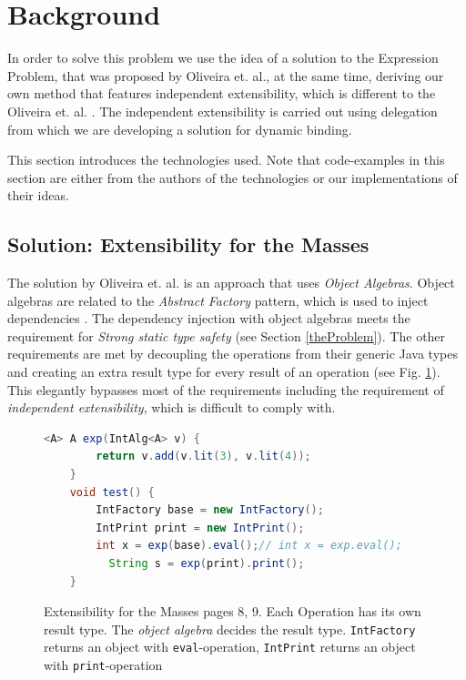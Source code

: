 \documentclass{report}
\begin{document}
\section{Background}

In order to solve this problem we use the idea of a solution to the Expression Problem, that was proposed by Oliveira et. al., at the same time, deriving our own method that features independent extensibility, which is different to the Oliveira et. al. \cite{Oliv-Extensibility-2012}. The independent extensibility is carried out using delegation from which we are developing a solution for dynamic binding.

This section introduces the technologies used. Note that code-examples in this section are either from the authors of the technologies or our implementations of their ideas.


\subsection{Solution: Extensibility for the Masses}

The solution by Oliveira et. al. \cite{Oliv-Extensibility-2012} is an approach that uses \emph{Object Algebras}. Object algebras are related to the \emph{Abstract Factory} pattern, which is used to inject dependencies \cite{Gof-Design-1993}. The dependency injection with object algebras meets the requirement for \emph{Strong static type safety} (see Section \ref{theProblem}). The other requirements are met by decoupling the operations from their generic Java types and creating an extra result type for every result of an operation (see Fig. \ref{differentAlgebras}). This elegantly bypasses most of the requirements including the requirement of \emph{independent extensibility}, which is difficult to comply with.

\begin{figure}[h]
\begin{lstlisting}[language=java]
    <A> A exp(IntAlg<A> v) {
        return v.add(v.lit(3), v.lit(4));
    }
    void test() {
        IntFactory base = new IntFactory();
        IntPrint print = new IntPrint();
        int x = exp(base).eval();// int x = exp.eval();
￼￼        String s = exp(print).print();
    }
\end{lstlisting}
\caption{Extensibility for the Masses \cite{Oliv-Extensibility-2012} pages 8, 9. Each Operation has its own result type. The \emph{object algebra} decides the result type. \lstinline{IntFactory} returns an object with \lstinline{eval}-operation, \lstinline{IntPrint} returns an object with \lstinline{print}-operation}
\label{differentAlgebras}
\end{figure}
\end{document}
